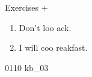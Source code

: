 \documentclass[aspectratio=169,xcolor={dvipsnames,table}]{beamer}
\begin{document}
\begin{frame}[plain]{Exercises  $+$ }
  \Large
  \begin{enumerate}
    \item<2-> Don't loo  ack.
    \item<4-> I will coo  reakfast.
  \end{enumerate}

  \hfill{\tiny 0110}\,{\scriptsize {}\,kb\_03}

\end{frame}
\end{document}
